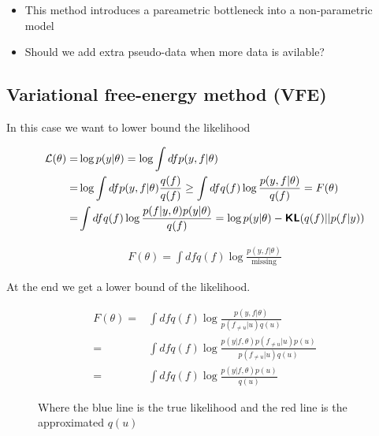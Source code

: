 \documentclass[b5paper]{report}
\begin{document}
\begin{itemize}
  \item This method introduces a pareametric bottleneck into a non-parametric
    model
  \item Should we add extra pseudo-data when more data is avilable?
\end{itemize}

\subsection{Variational free-energy method (VFE)}

In this case we want to lower bound the likelihood

\begin{align}
  \operatorname*{\mathcal{L}}(\theta) =& \log p(y|\theta) = \log \int df p(y,f|\theta) \\
  =& \log \int df p(y, f|\theta) \frac{q(f)}{q(f)} \ge \int dfq(f) \log
  \frac{p(y,f|\theta)}{q(f)} = F(\theta) \\
  =& \int dfq(f) \log \frac{p(f|y,\theta)p(y|\theta)}{q(f)} = \log p(y|\theta)
  - \operatorname*{\bm{\mathsf{KL}}}(q(f)||p(f|y))
\end{align}

\begin{align}
  F(\theta) = \int dfq(f) \log \frac{p(y,f|\theta)}{\text{missing}}
\end{align}

At the end we get a lower bound of the likelihood.

\begin{align}
  F(\theta) =& \int dfq(f) \log \frac{p(y,f|\theta)}{p(f_{\ne u}|u)q(u)} \\
  =& \int dfq(f) \log \frac{p(y|f,\theta)p(f_{\ne u}|u)p(u)}{p(f_{\ne u}|u)q(u)} \\
  =& \int dfq(f) \log \frac{p(y|f,\theta)p(u)}{q(u)}
\end{align}


\begin{figure}[h]
  \centering
  \caption{Where the {\color{blue}blue line} is the true likelihood and the
    {\color{red}red} line is the approximated $q(u)$}
\end{figure}
\end{document}
